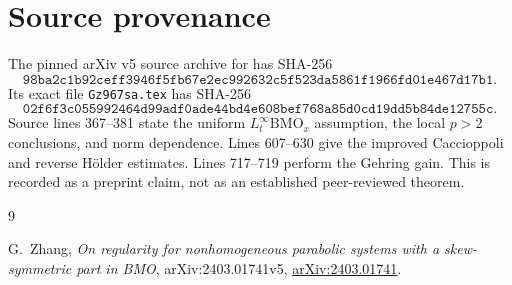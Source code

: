 \documentclass[11pt]{article}
\theoremstyle{remark}
\begin{document}
\section*{Source provenance}

The pinned arXiv v5 source archive for
\cite{ZhangBMO} has SHA-256
\[
\texttt{98ba2c1b92ceff3946f5fb67e2ec992632c5f523da5861f1966fd01e467d17b1}.
\]
Its exact file \texttt{Gz967sa.tex} has SHA-256
\[
\texttt{02f6f3c055992464d99adf0ade44bd4e608bef768a85d0cd19dd5b84de12755c}.
\]
Source lines 367--381 state the uniform
\(L^\infty_t\mathrm{BMO}_x\) assumption, the local \(p>2\)
conclusions, and norm dependence.  Lines 607--630 give the improved
Caccioppoli and reverse H\"older estimates.  Lines 717--719 perform the
Gehring gain.  This is recorded as a preprint claim, not as an
established peer-reviewed theorem.

\begin{thebibliography}{9}
\raggedright

G.~Zhang,
\emph{On regularity for nonhomogeneous parabolic systems with a
skew-symmetric part in BMO},
arXiv:2403.01741v5,
\href{https://arxiv.org/abs/2403.01741}
{arXiv:2403.01741}.

\end{thebibliography}
\end{document}
